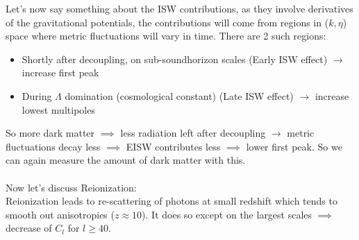 \documentclass{article}
\begin{document}
Let's now say something about the ISW contributions, as they involve derivatives of the gravitational potentials, the contributions will come from regions in ($k,\eta$) space where metric fluctuations will vary in time. There are 2 such regions: 
\begin{itemize}
  \item Shortly after decoupling, on sub-soundhorizon scales (Early ISW effect) $\rightarrow$ increase first peak
  \item During $\Lambda$ domination (cosmological constant) (Late ISW effect) $\rightarrow$ increase lowest multipoles
\end{itemize}
So more dark matter $\implies$ less radiation left after decoupling $\rightarrow$ metric fluctuations decay less $\implies$ EISW contributes less $\implies$ lower first peak. So we can again measure the amount of dark matter with this.\\\\
Now let's discuss Reionization:\\
Reionization leads to re-scattering of photons at small redshift which tends to smooth out anisotropies ($z\approx 10$). It does so except on the largest scales $\implies$ decrease of $C_l$ for $l\geq 40$.
\end{document}
